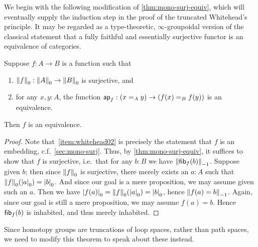 We begin with the following modification of \autoref{thm:mono-surj-equiv}, which will eventually supply the induction step in the proof of the truncated Whitehead's principle.
It may be regarded as a type-theoretic, $\infty$-groupoidal version of the classical statement that a fully faithful and essentially surjective functor is an equivalence of categories.

\begin{thm}\label{thm:whitehead0}
  Suppose $f:A\to B$ is a function such that
  \begin{enumerate}
  \item $\trunc0 f : \trunc0 A \to \trunc0 B$ is surjective, and\label{item:whitehead01}
  \item for any $x,y:A$, the function $\apfunc f : (\id[A]xy) \to (\id[B]{f(x)}{f(y)})$ is an equivalence.\label{item:whitehead02}
  \end{enumerate}
  Then $f$ is an equivalence.
\end{thm}
\begin{proof}
  Note that~\ref{item:whitehead02} is precisely the statement that $f$ is an embedding, c.f.~\autoref{sec:mono-surj}.
  Thus, by \autoref{thm:mono-surj-equiv}, it suffices to show that $f$ is surjective, i.e.\ that for any $b:B$ we have $\trunc{-1}{\hfib f b}$.
  Suppose given $b$; then since $\trunc0 f$ is surjective, there merely exists an $a:A$ such that $\trunc 0 f(\tproj0a) = \tproj0b$.
  And since our goal is a mere proposition, we may assume given such an $a$.
  Then we have $\tproj0{f(a)} = \trunc 0 f(\tproj0a) =\tproj0b$, hence $\trunc{-1}{f(a)=b}$.
  Again, since our goal is still a mere proposition, we may assume $f(a)=b$.
  Hence $\hfib f b$ is inhabited, and thus merely inhabited.
\end{proof}

Since homotopy groups are truncations of loop spaces, rather than path spaces, we need to modify this theorem to speak about these instead.

